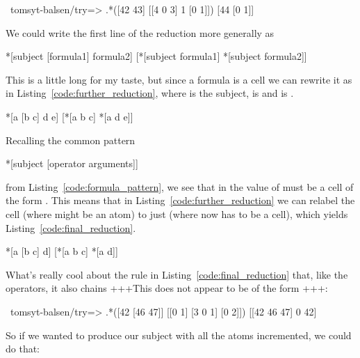 \begin{code}
~tomsyt-balsen/try=> .*([42 43] [[4 0 3] 1 [0 1]])
[44 [0 1]]
\end{code}
We could write the first line of the reduction more generally as

\begin{code}
*[subject [formula1] formula2]     [*[subject formula1] *[subject formula2]]
\end{code}
This is a little long for my taste, but since a formula is a cell we can
rewrite it as in Listing~\ref{code:further_reduction}, where  is the subject, \kode{[b c]} is  and \kode{[d e]} is .

\begin{codelisting}
\label{code:further_reduction}
\codecaption{}
\begin{code}
*[a [b c] d e]     [*[a b c] *[a d e]]
\end{code}
\end{codelisting}

Recalling the common pattern

\begin{code}
*[subject [operator arguments]]
\end{code}

from Listing~\ref{code:formula_pattern}, we see that in \kode{*[a d]} the value of  must be a cell of the form . This means that in Listing~\ref{code:further_reduction} we can relabel the cell  (where  might be an atom) to just  (where now  has to be a cell), which yields Listing~\ref{code:final_reduction}.

\begin{codelisting}
\label{code:final_reduction}
\codecaption{}
\begin{code}
*[a [b c] d]     [*[a b c] *[a d]]
\end{code}
\end{codelisting}

What's really cool about the rule in Listing~\ref{code:final_reduction} that, like the operators, it also chains +++This does not appear to be of the form \kode{*[a [b c] d]}+++:

\begin{code}
~tomsyt-balsen/try=> .*([42 [46 47]] [[0 1] [3 0 1] [0 2]])
[[42 46 47] 0 42]
\end{code}
So if we wanted to produce our subject with all the atoms incremented, we could
do that:

